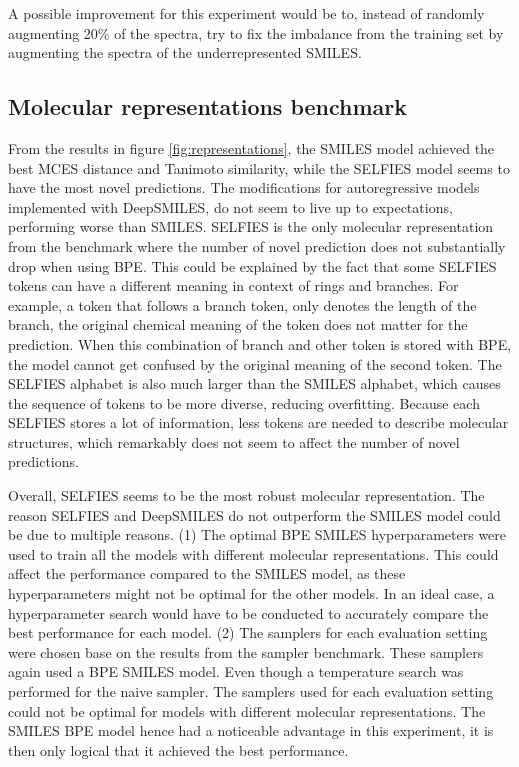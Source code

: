 A possible improvement for this experiment would be to, instead of randomly augmenting 20\% of the spectra, try to fix the imbalance from the training set by augmenting the spectra of the underrepresented SMILES.

\subsection{Molecular representations benchmark}

From the results in figure \ref{fig:representations}, the SMILES model achieved the best MCES distance and Tanimoto similarity, while the SELFIES model seems to have the most novel predictions.
The modifications for autoregressive models implemented with DeepSMILES, do not seem to live up to expectations, performing worse than SMILES.
SELFIES is the only molecular representation from the benchmark where the number of novel prediction does not substantially drop when using \ac{BPE}.
This could be explained by the fact that some SELFIES tokens can have a different meaning in context of rings and branches. 
For example, a token that follows a branch token, only denotes the length of the branch, the original chemical meaning of the token does not matter for the prediction.
When this combination of branch and other token is stored with \ac{BPE}, the model cannot get confused by the original meaning of the second token.
The SELFIES alphabet is also much larger than the SMILES alphabet, which causes the sequence of tokens to be more diverse, reducing overfitting.
Because each SELFIES stores a lot of information, less tokens are needed to describe molecular structures, which remarkably does not seem to affect the number of novel predictions.

Overall, SELFIES seems to be the most robust molecular representation.
The reason SELFIES and DeepSMILES do not outperform the SMILES model could be due to multiple reasons.
(1) The optimal \ac{BPE} SMILES hyperparameters were used to train all the models with different molecular representations.
This could affect the performance compared to the SMILES model, as these hyperparameters might not be optimal for the other models.
In an ideal case, a hyperparameter search would have to be conducted to accurately compare the best performance for each model.
(2) The samplers for each evaluation setting were chosen base on the results from the sampler benchmark.
These samplers again used a \ac{BPE} SMILES model. Even though a temperature search was performed for the naive sampler.
The samplers used for each evaluation setting could not be optimal for models with different molecular representations.
The SMILES \ac{BPE} model hence had a noticeable advantage in this experiment, it is then only logical that it achieved the best performance.

